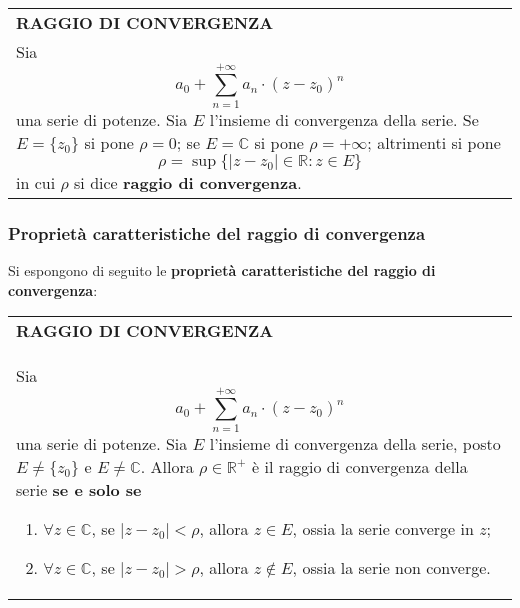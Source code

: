 \documentclass[a4paper]{extarticle}
\renewcommand\arraystretch{}
\begin{document}
\vspace{1em}
\setlength{\tabcolsep}{14pt}
\renewcommand{\arraystretch}{2}
\noindent
\begin{tabularx}{\textwidth}{@{}|P|@{}}
    \hline
    {\textbf{RAGGIO DI CONVERGENZA}}\\
    \parbox{\linewidth}{Sia 
    \[a_0 + \sum_{n=1}^{+\infty} a_n \cdot (z-z_0)^n\]
    una serie di potenze. Sia $E$ l'insieme di convergenza della serie. Se $E = \{z_0\}$ si pone $\rho=0$; se $E = \mathbb{C}$ si pone $\rho = +\infty$; altrimenti si pone
    \[\rho = \sup \{\left \vert z-z_0 \right \vert \in \mathbb{R} : z \in E\}\]
    in cui $\rho$ si dice \textbf{raggio di convergenza}.\vspace{3mm}}\\
    \hline
\end{tabularx}

\vspace{1em}
\subsubsection{Proprietà caratteristiche del raggio di convergenza}
Si espongono di seguito le \textbf{proprietà caratteristiche del raggio di convergenza}:

\vspace{1em}
\setlength{\tabcolsep}{14pt}
\renewcommand{\arraystretch}{2}
\noindent
\begin{tabularx}{\textwidth}{@{}|P|@{}}
    \hline
    {\textbf{RAGGIO DI CONVERGENZA}}\\
    \parbox{\linewidth}{Sia 
    \[a_0 + \sum_{n=1}^{+\infty} a_n \cdot (z-z_0)^n\]
    una serie di potenze. Sia $E$ l'insieme di convergenza della serie, posto $E \neq \{z_0\}$ e $E \neq \mathbb{C}$.\\
    Allora $\rho \in \mathbb{R}^+$ è il raggio di convergenza della serie \textbf{se e solo se}
    \begin{enumerate}
        \item $\forall z \in \mathbb{C}$, se $\left \vert z-z_0 \right \vert < \rho$, allora $z \in E$, ossia la serie converge in $z$;
        \item $\forall z \in \mathbb{C}$, se $\left \vert z-z_0 \right \vert > \rho$, allora $z \notin E$, ossia la serie non converge.
    \end{enumerate}
    \vspace{3mm}}\\
    \hline
\end{tabularx}
\end{document}
